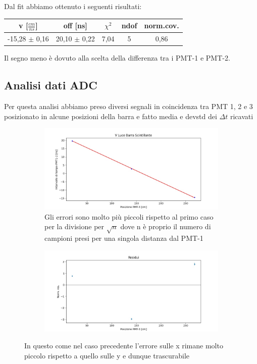 \documentclass[a4paper]{article}
\begin{document}
Dal fit abbiamo ottenuto i seguenti risultati:

\begin{tabular}{|c|c|c|c|c|}
\hline
v [$\frac{cm}{ns}$] & off [ns] & $\chi ^2$ & ndof & norm.cov. \\
\hline
-15,28 $\pm$ 0,16 & 20,10 $\pm$ 0,22& 7,04 & 5 & 0,86\\
\hline
\end{tabular}

Il segno meno è dovuto alla scelta della differenza tra i PMT-1 e PMT-2.

\subsection{Analisi dati ADC}
Per questa analisi abbiamo preso diversi segnali in coincidenza tra PMT 1, 2 e 3 posizionato in alcune posizioni della barra e fatto media e devstd dei $\Delta t$ ricavati

\begin{figure}[H]
     \begin{subfigure}[b]{0.47\textwidth}
         \centering
         \includegraphics[width=\textwidth]{./immagini/TimeOfFlight/VLightBarraADC}
         \caption{Gli errori sono molto più piccoli rispetto al primo caso per la divisione per $\sqrt{n}$ dove n è proprio il numero di campioni presi per una singola distanza dal PMT-1}
         \label{fig:FitVLightBarraADC}
     \end{subfigure}
     \hfill
     \begin{subfigure}[b]{0.47\textwidth}
         \centering
         \includegraphics[width=\textwidth]{./immagini/TimeOfFlight/ResVLightBarraADC}
         \caption{}
         \label{fig:ResVLIghtBarraADC}
     \end{subfigure}
     \caption{In questo come nel caso precedente l'errore sulle x rimane molto piccolo rispetto a quello sulle y e dunque trascurabile}        
     \label{fig:FitLinVLightBarraADC}
\end{figure}
\end{document}
